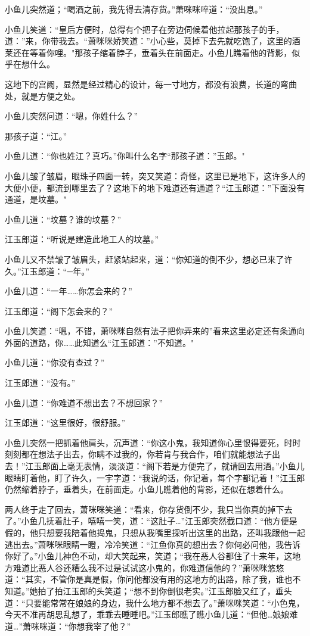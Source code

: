 \documentclass[12pt,oneside]{book}
\begin{document}
小鱼儿突然道；``喝酒之前，我先得去清存货。''萧咪咪啐道：``没出息。''

小鱼儿笑道：``皇后方便时，总得有个把子在旁边伺候着他拉起那孩子的手，道：''来，你带我去。``萧咪咪娇笑道：''小心些，莫掉下去先就吃饱了，这里的酒莱还在等着你哩。"那孩子缩着脖子，垂着头在前面走。小鱼儿瞧着他的背影，似乎在想什么。

这地下的宫阙，显然是经过精心的设计，每一寸地方，都没有浪费，长道的弯曲处，就是方便之处。

小鱼儿突然问道：``嗯，你姓什么？''

那孩子道：``江。''

小鱼儿道：``你也姓江？真巧。''你叫什么名字``那孩子道：''玉郎。"

小鱼儿皱了皱眉，眼珠子四面一转，突又笑道：奇怪，这里已是地下，这许多人的大便小便，都流到哪里去了？这地下的地下难道还有通道？``江玉郎道：''下面没有通道，是坟墓。"

小鱼儿道：``坟墓？谁的坟墓？''

江玉郎道：``听说是建造此地工人的坟墓。''

小鱼儿又不禁皱了皱眉头，赶紧站起来，道：``你知道的倒不少，想必已来了许久。''江玉郎道：``─年。''

小鱼儿道：``一年\ldots\ldots 你怎会来的？''

江玉郎道：``阁下怎会来的？''

小鱼儿笑道：``嗯，不错，萧咪咪自然有法子把你弄来的''看来这里必定还有条通向外面的道路，你\ldots\ldots 此知道么``江玉郎道：''不知道。"

小鱼儿道：``你没有查过？''

江玉郎道：``没有。''

小鱼儿道：``你难道不想出去？不想回家？''

江玉郎道：``这里很好，很舒服。''

小鱼儿突然一把抓着他肩头，沉声道：``你这小鬼，我知道你心里恨得要死，时时刻刻都在想法子出去，你瞒不过我的，你若肯与我合作，咱们就能想法子出去！''江玉郎面上毫无表情，淡淡道：``阁下若是方便完了，就请回去用酒。''小鱼儿眼睛盯着他，盯了许久，一宇字道：``我说的话，你记着，每个字都记着！''江玉郎仍然缩着脖子，垂着头，在前面走。小鱼儿瞧着他的背影，还似在想着什么。

两人终于走了回去，萧咪咪笑道：``看来，你存货倒不少，我只当你真的掉下去了。''小鱼几抚着肚子，嘻嘻一笑，道：``这肚子\ldots{}''江玉郎突然截口道：``他方便是假的，他只想要我陪着他捣鬼，只想从我嘴里探听出这里的出路，还叫我跟他一起逃出去。''萧咪咪眼睛一瞪，冷冷笑道：``江鱼你真的想出去？你何必问他，我告诉你好了。''小鱼儿神色不动，却大笑起来，笑道；``我在恶人谷都住了十来年，这地方难道比恶人谷还糟么我不过是试试这小鬼的，你难道信他的？''萧咪咪悠悠道：``其实，不管你是真是假，你问他都没有用的这地方的出路，除了我，谁也不知道。''她拍了拍江玉郎的头笑道；``想不到你倒很老实。''江玉郎脸又红了，垂头道：``只要能常常在娘娘的身边，我什么地方都不想去了。''萧咪咪笑道：``小色鬼，今天不准再胡思乱想了，乖乖去睡睡吧。''江玉郎瞧了瞧小鱼儿道：``但他\ldots 娘娘难道\ldots{}''萧咪咪道：``你想我宰了他？''
\end{document}
